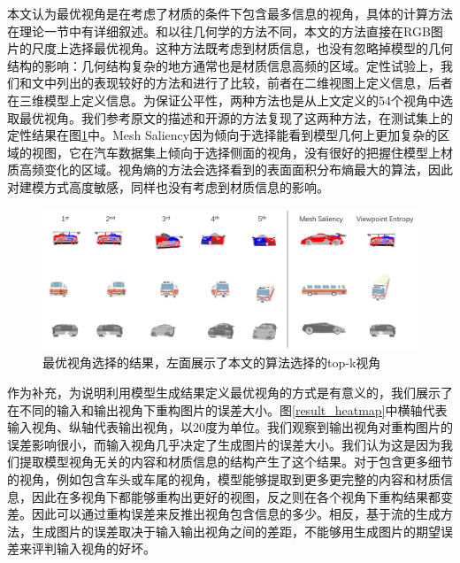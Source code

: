 \documentclass[UTF8,openany,AutoFakeBold,AutoFakeSlant,cs4size]{ctexbook}
\begin{document}
本文认为最优视角是在考虑了材质的条件下包含最多信息的视角，具体的计算方法在理论一节中有详细叙述。和以往几何学的方法不同，本文的方法直接在RGB图片的尺度上选择最优视角。这种方法既考虑到材质信息，也没有忽略掉模型的几何结构的影响：几何结构复杂的地方通常也是材质信息高频的区域。定性试验上，我们和\cite{Dutagaci2010ABF}文中列出的表现较好的方法\cite{Vzquez2003AutomaticVS}和\cite{Lee2005MeshS}进行了比较，前者在二维视图上定义信息，后者在三维模型上定义信息。为保证公平性，两种方法也是从上文定义的54个视角中选取最优视角。我们参考原文的描述和开源的方法复现了这两种方法，在测试集上的定性结果在图\ref{result_bestview}中。Mesh Saliency\cite{Lee2005MeshS}因为倾向于选择能看到模型几何上更加复杂的区域的视图，它在汽车数据集上倾向于选择侧面的视角，没有很好的把握住模型上材质高频变化的区域。视角熵\cite{Vzquez2003AutomaticVS}的方法会选择看到的表面面积分布熵最大的算法，因此对建模方式高度敏感，同样也没有考虑到材质信息的影响。

\begin{figure}
\centering
\includegraphics[width=\linewidth]{./images/best_viewpoint_thesis.png}
\caption{最优视角选择的结果，左面展示了本文的算法选择的top-k视角}
\label{result_bestview}
\end{figure}


作为补充，为说明利用模型生成结果定义最优视角的方式是有意义的，我们展示了在不同的输入和输出视角下重构图片的误差大小。图\ref{result_heatmap}中横轴代表输入视角、纵轴代表输出视角，以20度为单位。我们观察到输出视角对重构图片的误差影响很小，而输入视角几乎决定了生成图片的误差大小。我们认为这是因为我们提取模型视角无关的内容和材质信息的结构产生了这个结果。对于包含更多细节的视角，例如包含车头或车尾的视角，模型能够提取到更多更完整的内容和材质信息，因此在多视角下都能够重构出更好的视图，反之则在各个视角下重构结果都变差。因此可以通过重构误差来反推出视角包含信息的多少。相反，基于流的生成方法，生成图片的误差取决于输入输出视角之间的差距，不能够用生成图片的期望误差来评判输入视角的好坏。
\end{document}
